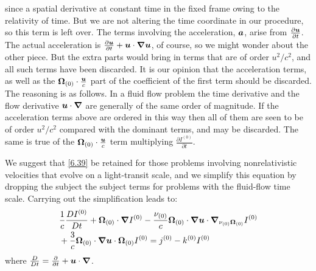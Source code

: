 since a spatial derivative at constant time in the fixed frame owing to the
relativity of time. But we are not altering the time coordinate in our
procedure, so this term is left over. The terms involving the acceleration,
$\boldsymbol{a}$, arise from $\frac{\partial \boldsymbol{u}}{\partial t}$. The actual
acceleration is $\frac{\partial \boldsymbol{u}}{\partial t} + \boldsymbol{u}\cdot\boldsymbol{\nabla}\boldsymbol{u}$,
of course, so we might wonder about the other piece. But the extra parts would
bring in terms that are of order $u^2/c^2$, and all such terms have been
discarded. It is our opinion that the acceleration terms, as well as the
$\boldsymbol{\Omega}_{(0)}\cdot \frac{\boldsymbol{u}}{c}$ part of the coefficient of the first term
should be discarded. The reasoning is as follows. In a fluid flow problem the
time derivative and the flow derivative $\boldsymbol{u}\cdot\boldsymbol{\nabla}$ are generally of the
same order of magnitude. If the acceleration terms above are ordered in this
way then all of them are seen to be of order $u^2/c^2$ compared with the
dominant terms, and may be discarded. The same is true of the
$\boldsymbol{\Omega}_{(0)}\cdot\frac{\boldsymbol{u}}{c}$ term multiplying $\frac{\partial
I^{(0)}}{\partial t}$.

We suggest that \cref{6.39} be retained for those problems involving
nonrelativistic velocities that evolve on a light-transit scale, and we
simplify this equation by dropping the subject the subject terms for problems
with the fluid-flow time scale. Carrying out the simplification leads to:
\begin{equation}
  \begin{split}
    &\frac{1}{c}\frac{D I^{(0)}}{Dt} +\boldsymbol{\Omega}_{(0)}\cdot\boldsymbol{\nabla}
    I^{(0)}-\frac{\nu_{(0)}}{c}\boldsymbol{\Omega}_{(0)}\cdot\boldsymbol{\nabla}\boldsymbol{u}\cdot
    \boldsymbol{\nabla}_{\nu_{(0)}\boldsymbol{\Omega}_{(0)}}I^{(0)}\\
    &+\frac{3}{c}\boldsymbol{\Omega}_{(0)}\cdot\boldsymbol{\nabla}\boldsymbol{u}\cdot\boldsymbol{\Omega}_{(0)}I^{(0)} =
    j^{(0)}-k^{(0)}I^{(0)}
  \end{split}
\end{equation}
where $\frac{D}{Dt}=\frac{\partial}{\partial t}+\boldsymbol{u}\cdot\boldsymbol{\nabla}$.

